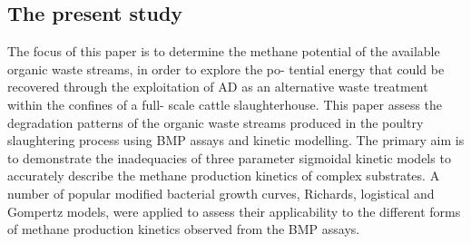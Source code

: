 \subsection{The present study}
The focus of this paper is to determine the methane potential of the available organic waste streams, in order to explore the po- tential energy that could be recovered through the exploitation of AD as an alternative waste treatment within the confines of a full- scale cattle slaughterhouse. This paper assess the degradation patterns of the organic waste streams produced in the poultry slaughtering process using BMP assays and kinetic modelling. The primary aim is to demonstrate the inadequacies of three parameter sigmoidal kinetic models to accurately describe the methane production kinetics of complex substrates. A number of popular modified bacterial growth curves, Richards, logistical and Gompertz models, were applied to assess their applicability to the different forms of methane production kinetics observed from the BMP assays.